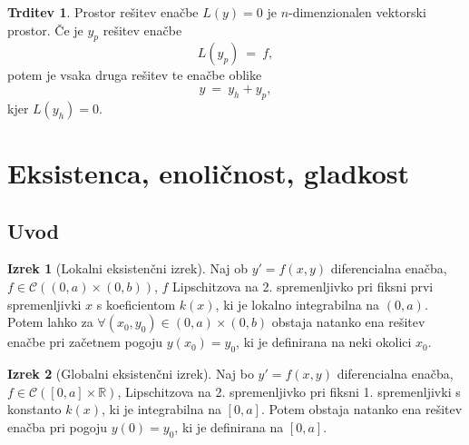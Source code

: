 \documentclass[11pt]{article}
\newcommand{\R}{\mathbb{R}}
\newcommand{\C}{\mathcal{C}}
\theoremstyle{definition}
\theoremstyle{definition}
\newtheorem{trditev}{Trditev}[section]
\theoremstyle{definition}
\newtheorem{izrek}{Izrek}[section]
\theoremstyle{definition}
\begin{document}
\begin{trditev}

Prostor rešitev enačbe $L(y) = 0$ je $n$-dimenzionalen vektorski prostor. Če je $y_p$ rešitev enačbe
$$L(y_p) ~=~ f,$$
potem je vsaka druga rešitev te enačbe oblike
$$y ~=~ y_h + y_p,$$
kjer $L(y_h) = 0$.

\end{trditev}
\vspace{0.5cm}


\pagebreak


\section{Eksistenca, enoličnost, gladkost}
\vspace{0.5cm}


\subsection{Uvod}
\vspace{0.5cm}

\begin{izrek}[Lokalni eksistenčni izrek]

Naj ob $y' = f(x,y)$ diferencialna enačba, $f \in \C((0,a)\times(0,b))$, $f$ Lipschitzova na 2. spremenljivko pri fiksni prvi spremenljivki $x$ s koeficientom $k(x)$, ki je lokalno integrabilna na $(0,a)$. Potem lahko za $\forall (x_0,y_0) \in (0,a) \times (0,b)$ obstaja natanko ena rešitev enačbe pri začetnem pogoju $y(x_0) = y_0$, ki je definirana na neki okolici $x_0$. 

\end{izrek}
\vspace{0.5cm}

\begin{izrek}[Globalni eksistenčni izrek]

Naj bo $y' = f(x,y)$ diferencialna enačba, $f \in \C([0,a] \times \R)$, Lipschitzova na 2. spremenljivko pri fiksni 1. spremenljivki s konstanto $k(x)$, ki je integrabilna na $[0,a]$. Potem obstaja natanko ena rešitev enačba pri pogoju $y(0) = y_0$, ki je definirana na $[0,a]$.

\end{izrek}
\vspace{0.5cm}
\end{document}
